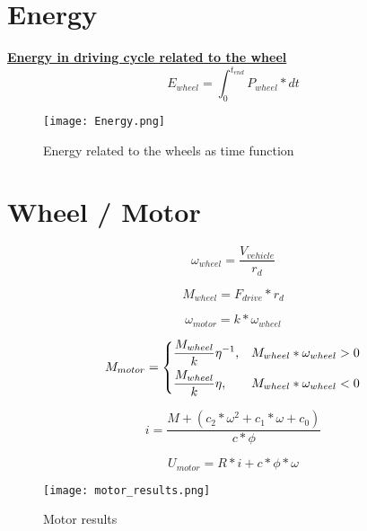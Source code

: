 \documentclass[a4paper,14pt,twoside]{extreport}
\begin{document}
\textbf{}
\section{Energy}
\textbf{\underline{Energy in driving cycle related to the wheel}}
\begin{equation}
E_{wheel} = \int_{0}^{t_{end}} P_{wheel}*dt
\end{equation}

\begin{figure}[H]
  \centerline{\texttt{[image: Energy.png]}} 
  \caption{Energy related to the wheels as time function}
\end{figure}


\section{Wheel / Motor}
\begin{equation}
\omega_{wheel} = \frac{V_{vehicle}}{r_d}
\end{equation}

\begin{equation}
M_{wheel} = F_{drive}*r_d
\end{equation}

\begin{equation}
\omega_{motor} = k*\omega_{wheel}
\end{equation}


\[\begin{equation}
    M_{motor}= 
\begin{dcases}
    \frac{M_{wheel}}{k}\eta^{-1},&  M_{wheel}*\omega_{wheel} > 0\\
    \frac{M_{wheel}}{k}\eta,&         M_{wheel}*\omega_{wheel} < 0
\end{dcases}
\end{equation}\]


\begin{equation}
i = \frac{M + (c_2*\omega^2 + c_1*\omega + c_0)}{c*\phi}
\end{equation}

\begin{equation}
U_{motor} = R*i + c*\phi*\omega
\end{equation}

\begin{figure}[H]
  \centerline{\texttt{[image: motor\_results.png]}} 
  \caption{Motor results}
\end{figure}
\end{document}
